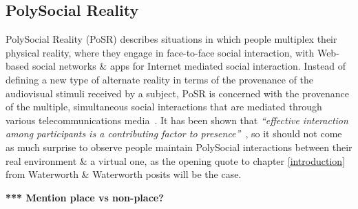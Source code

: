 
\subsection{PolySocial Reality}

PolySocial Reality (PoSR) describes situations in which people multiplex their physical reality, where they engage in face-to-face social interaction, with Web-based social networks \& apps for Internet mediated social interaction. Instead of defining a new type of alternate reality in terms of the provenance of the audiovisual stimuli received by a subject, PoSR is concerned with the provenance of the multiple, simultaneous social interactions that are mediated through various telecommunications media~\cite{Applin2012}. It has been shown that \textit{``effective interaction among participants is a contributing factor to presence''}~\cite{Terashima2001}, so it should not come as much surprise to observe people maintain PolySocial interactions between their real environment \& a virtual one, as the opening quote to chapter \ref{introduction} from Waterworth \& Waterworth posits will be the case.

\textbf{*** Mention place vs non-place?}







